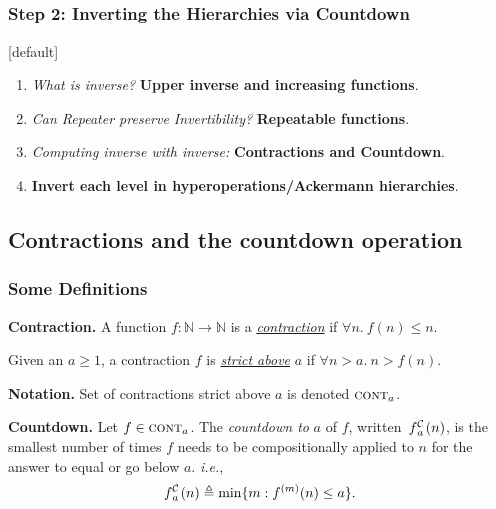 \subsection*{}
\begin{frame}
\frametitle{Step 2: Inverting the Hierarchies via \textbf{Countdown}}
[default]

\begin{enumerate}[\bfseries 1.]
	\itemsep 3ex
	\item<done@1->
	\emph{What is inverse?} \textbf{Upper inverse and increasing functions}.
	
	\item<done@1->
	\emph{Can Repeater preserve Invertibility?} \textbf{Repeatable functions}.
	
	\item<come@2->
	\emph{Computing inverse with inverse:} \textbf{Contractions and Countdown}.
	
	\item
	\textbf{Invert each level in hyperoperations/Ackermann hierarchies}.
\end{enumerate}
\end{frame}


\subsection{Contractions and the countdown operation}


\begin{frame}
\frametitle{Some Definitions}

\pause 
\textbf{Contraction.} A function $f : \mathbb{N} \to \mathbb{N}$ is a
\href{https://github.com/inv-ack/inv-ack/blob/7270e64a2600b771f2b1b1b151f7d13fb2ae6c97/countdown.v\#L40-L42}{\emph{contraction}} if $\forall n.~ f(n) \le n$.

Given an $a \ge 1$, a contraction $f$ is
\href{https://github.com/inv-ack/inv-ack/blob/7270e64a2600b771f2b1b1b151f7d13fb2ae6c97/countdown.v\#L44-L46}{\emph{strict above}} $a$ if $\forall n > a.~n > f(n)$.

\bigskip

\textbf{Notation.} Set of contractions strict above $a$ is denoted $\text{\scshape{cont}}_a$.

\bigskip

\pause 
\textbf{Countdown.} Let $f\in \text{\scshape{cont}}_a$. The \textit{countdown to} $a$ of $f$, written~$\cdt{f}{a}(n)$, is the smallest number of times $f$ needs to be compositionally applied to
$n$ for the answer to equal or go below $a$. \emph{i.e.},
\begin{equation*}
\cdt{f}{a}(n) \triangleq \min\{m: f^{(m)}(n)\le a \}.
\end{equation*}
\end{frame}


